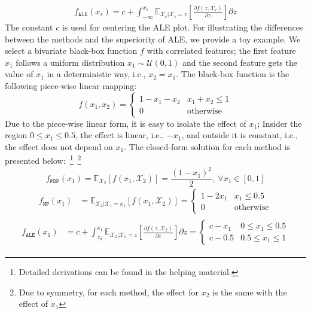 \documentclass[wcp]{jmlr}
\newcommand{\Xcb}{\mathcal{X}_c}
\newcommand{\E}{\mathbb{E}}
\begin{document}
\begin{gather}
  \label{eq:ALE} f_{\mathtt{ALE}}(x_s) = c + \int_{-\infty}^{x_s} \mathbb{E}_{\Xcb|\mathcal{X}_s=z}\left[\frac{\partial f(z, \mathcal{X}_c)}{\partial z}\right] \partial z
\end{gather}
%
The constant \(c\) is used for centering the ALE plot. For illustrating the differences between the methods and the superiority of ALE, we provide a toy example. We select a bivariate black-box function \(f\) with correlated features; the first feature \( x_1 \) follows a uniform distribution \( x_1 \sim \mathcal{U}(0,1)\) and the second feature gets the value of \(x_1\) in a deterministic way, i.e., \( x_2 = x_1 \). The black-box function is the following piece-wise linear mapping:
%
\begin{equation} \label{eq:example-1-mapping} f(x_1, x_2) =
  \begin{cases} 1 - x_1 - x_2 & x_1 + x_2 \leq 1 \\ 0 & \text{otherwise}
  \end{cases}
\end{equation}
\noindent
%
Due to the piece-wise linear form, it is easy to isolate the effect of \(x_1\); Insider the region \(0 \leq x_1 \leq 0.5\), the effect is linear, i.e., \(-x_1\), and outside it is constant, i.e., the effect does not depend on \(x_1\). The closed-form solution for each method is presented below:~\footnote{Detailed derivations can be found in the helping material.}~\footnote{ Due to symmetry, for each method, the effect for \(x_2\) is the same with the effect of \(x_1\)}
%
\begin{equation}\label{eq:example-1-pdp} f_{\mathtt{PDP}}(x_1) = \mathbb{\E}_{\mathcal{X}_2} \left [f(x_1,\mathcal{X}_2) \right] = \frac{{(1-x_1)}^2}{2}, \: \forall x_1 \in [0,1]
\end{equation}
%
\begin{equation} \label{eq:example-1-mplots}
  \begin{split} f_{\mathtt{MP}}(x_1) &= \E_{\mathcal{X}_2|\mathcal{X}_1 = x_1} \left [ f(x_1, \mathcal{X}_2) \right] = \begin{cases} 1 - 2x_1 & x_1 \leq 0.5 \\ 0 &\text{otherwise}
    \end{cases}
  \end{split}
\end{equation}
%
\begin{align}\label{eq:example-1-ale}
  \begin{split} f_{\mathtt{ALE}}(x_1) &= c + \int_{z_0}^{x_1} \E_{\mathcal{X}_2|\mathcal{X}_1=z} \left [ \frac{\partial f(z, \mathcal{X}_2)}{\partial z} \right] \partial z =
     \begin{cases} c - x_1 & 0 \leq x_1 \leq 0.5\\ c - 0.5 & 0.5 \leq x_1 \leq 1
    \end{cases}
  \end{split}
\end{align}
\end{document}
